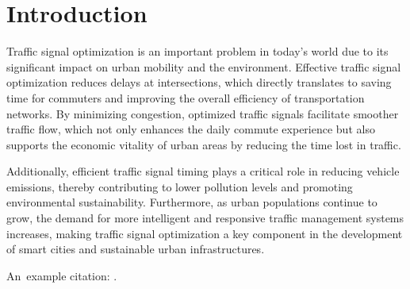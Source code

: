 \chapter*{Introduction}

Traffic signal optimization is an important problem in today's world due to its
significant impact on urban mobility and the environment. Effective traffic
signal optimization reduces delays at intersections, which directly translates
to saving time for commuters and improving the overall efficiency of
transportation networks. By minimizing congestion, optimized traffic signals
facilitate smoother traffic flow, which not only enhances the daily commute
experience but also supports the economic vitality of urban areas by reducing
the time lost in traffic.

Additionally, efficient traffic signal timing plays a
critical role in reducing vehicle emissions, thereby contributing to lower
pollution levels and promoting environmental sustainability. Furthermore, as
urban populations continue to grow, the demand for more intelligent and
responsive traffic management systems increases, making traffic signal
optimization a key component in the development of smart cities and sustainable
urban infrastructures.

An~example citation: \cite{google_coding_competitions} \cite{rodrigues2023principled} \cite{libuilding} \cite{russell2022aima}.